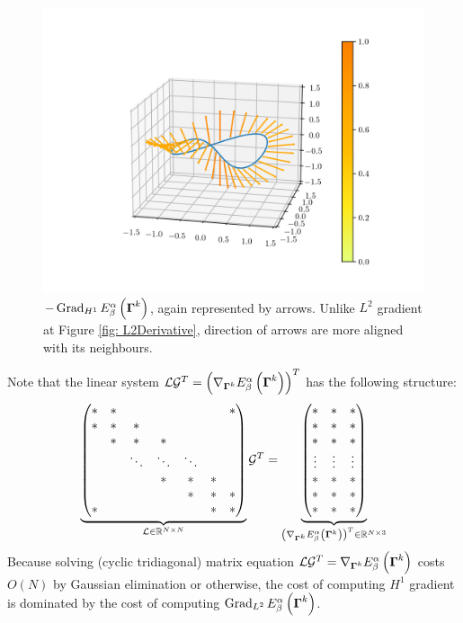 \documentclass[../dissertation.tex]{subfiles}
\begin{document}
\begin{figure}[tbp]
    \centering
    \includegraphics[width=\textwidth]{sections/unknottingCurveImgs/H1Derivative}
    \caption{$-\operatorname{Grad}_{H^1} E_{\beta}^{\alpha} \left( \boldsymbol{\Gamma}^k \right)$, again represented by arrows. Unlike $L^2$ gradient at Figure \ref{fig: L2Derivative}, direction of arrows are more aligned with its neighbours.}
    \label{fig: H1 Derivative}
\end{figure}
Note that the linear system $\mathcal{L} \mathcal{G}^T = \left( \nabla_{\boldsymbol{\Gamma}^k} E_{\beta}^{\alpha} \left( \boldsymbol{\Gamma}^k \right) \right)^T$ has the following structure:
\begin{equation*}
    \underbrace{
    \begin{pmatrix}
        * & * &   &   &   & & * \\
        * & * & * &   &   & &  \\
          & * & * & * &  &  &   \\
          &   & \ddots  & \ddots & \ddots &  & \\
          &   &   & *  &  * & * & \\
          &  & &  & *  & *  & * \\
        * &   & &  &   & *  & *
    \end{pmatrix}
}_{\mathcal{L} \in \mathbb{R}^{N \times N}}
\mathcal{G}^T
=
\underbrace{
\begin{pmatrix}
    * & * & * \\
    * & * & * \\
    * & * & * \\
    \vdots & \vdots & \vdots \\
    * & * & * \\
    * & * & * \\
    * & * & *
\end{pmatrix}
}_{\left( \nabla_{\boldsymbol{\Gamma}^k} E_{\beta}^{\alpha} \left( \boldsymbol{\Gamma}^k \right) \right)^T \in \mathbb{R}^{N \times 3}}
\end{equation*}
Because solving (cyclic tridiagonal) matrix equation $\mathcal{L} \mathcal{G}^T = \nabla_{\boldsymbol{\Gamma}^k} E_{\beta}^{\alpha} \left( \boldsymbol{\Gamma}^k \right)$ costs $O \left( N \right)$ by Gaussian elimination or otherwise\cite{10.1145/44164.44165},
the cost of computing $H^1$ gradient is dominated by the cost of computing $\operatorname{Grad}_{L^2} E_{\beta}^{\alpha} \left( \boldsymbol{\Gamma}^k \right)$.
\end{document}
